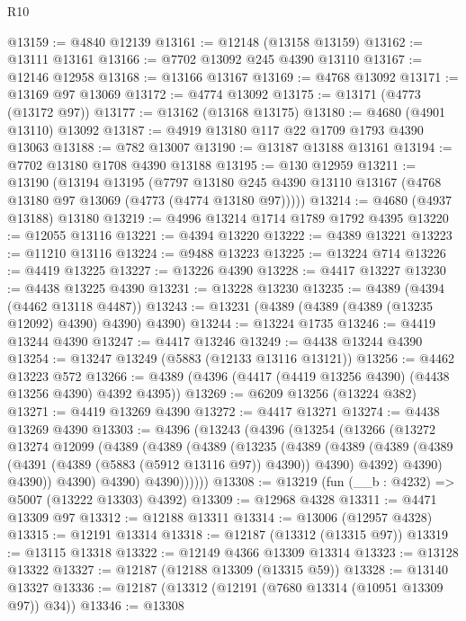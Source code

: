 \begin{lexlean}{R10}
\begin{coremodule}
@13159 := @4840 @12139
@13161 := @12148 (@13158 @13159)
@13162 := @13111 @13161
@13166 := @7702 @13092 @245 @4390 @13110
@13167 := @12146 @12958
@13168 := @13166 @13167
@13169 := @4768 @13092
@13171 := @13169 @97 @13069
@13172 := @4774 @13092
@13175 := @13171 (@4773 (@13172 @97))
@13177 := @13162 (@13168 @13175)
@13180 := @4680 (@4901 @13110) @13092
@13187 := @4919 @13180 @117 @22 @1709 @1793 @4390 @13063
@13188 := @782 @13007
@13190 := @13187 @13188 @13161
@13194 := @7702 @13180 @1708 @4390 @13188
@13195 := @130 @12959
@13211 := @13190
    (@13194
      @13195
      (@7797 @13180 @245 @4390 @13110 @13167 (@4768 @13180 @97 @13069 (@4773 (@4774 @13180 @97)))))
@13214 := @4680 (@4937 @13188) @13180
@13219 := @4996 @13214 @1714 @1789 @1792 @4395
@13220 := @12055 @13116
@13221 := @4394 @13220
@13222 := @4389 @13221
@13223 := @11210 @13116
@13224 := @9488 @13223
@13225 := @13224 @714
@13226 := @4419 @13225
@13227 := @13226 @4390
@13228 := @4417 @13227
@13230 := @4438 @13225 @4390
@13231 := @13228 @13230
@13235 := @4389 (@4394 (@4462 @13118 @4487))
@13243 := @13231 (@4389 (@4389 (@4389 (@13235 @12092) @4390) @4390) @4390)
@13244 := @13224 @1735
@13246 := @4419 @13244 @4390
@13247 := @4417 @13246
@13249 := @4438 @13244 @4390
@13254 := @13247 @13249 (@5883 (@12133 @13116 @13121))
@13256 := @4462 @13223 @572
@13266 := @4389 (@4396 (@4417 (@4419 @13256 @4390) (@4438 @13256 @4390) @4392 @4395))
@13269 := @6209 @13256 (@13224 @382)
@13271 := @4419 @13269 @4390
@13272 := @4417 @13271
@13274 := @4438 @13269 @4390
@13303 := @4396
    (@13243
      (@4396
        (@13254
          (@13266
            (@13272
              @13274
              @12099
              (@4389
                (@4389
                  (@4389
                    (@13235
                      (@4389
                        (@4389
                          (@4389
                            (@4389 (@4391 (@4389 (@5883 (@5912 @13116 @97)) @4390)) @4390)
                            @4392)
                          @4390)
                        @4390))
                    @4390)
                  @4390)
                @4390))))))
@13308 := @13219 (fun (__b : @4232) => @5007 (@13222 @13303) @4392)
@13309 := @12968 @4328
@13311 := @4471 @13309 @97
@13312 := @12188 @13311
@13314 := @13006 (@12957 @4328)
@13315 := @12191 @13314
@13318 := @12187 (@13312 (@13315 @97))
@13319 := @13115 @13318
@13322 := @12149 @4366 @13309 @13314
@13323 := @13128 @13322
@13327 := @12187 (@12188 @13309 (@13315 @59))
@13328 := @13140 @13327
@13336 := @12187 (@13312 (@12191 (@7680 @13314 (@10951 @13309 @97)) @34))
@13346 := @13308

\end{coremodule}
\end{lexlean}
